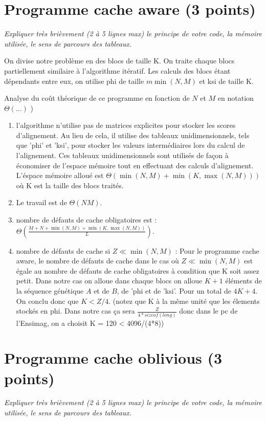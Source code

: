 \documentclass[10pt,a4paper]{article}
\begin{document}
\section{Programme cache aware  (3 points)}
{\em Expliquer très brièvement (2 à 5 lignes max) le principe de votre code, la mémoire utilisée, le sens de parcours des tableaux.}
\vspace*{1.0cm}

On divise notre problème en des blocs de taille K. On traite chaque blocs partiellement similaire à l'algorithme itératif. Les calculs des blocs étant dépendants entre eux, on utilise phi de taille $m\min(N, M)$ et ksi de taille K.

\vspace*{1.0cm}

Analyse du coût théorique de ce  programme en fonction de $N$ et $M$  en notation $\Theta(...)$ )
\begin{enumerate}
  \item  l'algorithme n'utilise pas de matrices explicites pour stocker les scores d'alignement. Au lieu de cela, il utilise des tableaux unidimensionnels, tels que 'phi' et 'ksi', pour stocker les valeurs intermédiaires lors du calcul de l'alignement. Ces tableaux unidimensionnels sont utilisés de façon à économiser de l'espace mémoire tout en effectuant des calculs d'alignement.
  L'éspace mémoire alloué est $\Theta(\min(N,M) + \min(K, \max(N,M))) $ où K est la taille des blocs traités. 
  \item Le travail est de  $\Theta(NM)$.
  \item nombre de défauts de cache obligatoires est : $\Theta(\frac{M + N+\min(N,M) + \min(K, \max(N,M))}{L})$.
  \item nombre de défauts de cache si $Z \ll \min(N,M)$ : Pour le programme cache aware, le nombre de défauts de cache dans le cas où  $Z \ll \min(N,M)$ est égale au nombre de défauts de cache obligatoires à condition que K soit assez petit. Dans notre cas on alloue dans chaque blocs on alloue $K+1$ éléments de la séquence génétique $A$ et de $B$, de 'phi et de 'ksi'. Pour un total de $4K + 4$. On conclu donc que $K < Z/4$. (notez que K à la même unité que les élements stockés en phi. Dans notre cas ça sera $\frac{Z}{4 * sizeof(long)}$ donc dans le pc de l'Ensimag, on a choisit K = 120 < 4096/(4*8))
\end{enumerate}

\section{Programme cache oblivious  (3 points)}
{\em Expliquer très brièvement (2 à 5 lignes max) le principe de votre code, la mémoire utilisée, le sens de parcours des tableaux.}
\vspace*{1.0cm}
\end{document}
